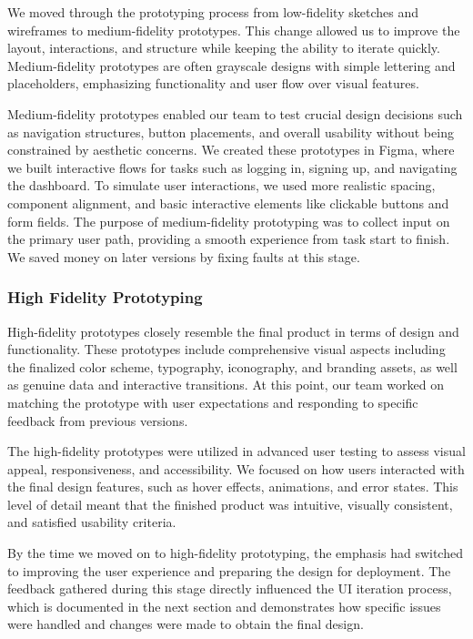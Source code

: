 We moved through the prototyping process from low-fidelity sketches and wireframes to medium-fidelity prototypes. This change allowed us to improve the layout, interactions, and structure while keeping the ability to iterate quickly. Medium-fidelity prototypes are often grayscale designs with simple lettering and placeholders, emphasizing functionality and user flow over visual features.

Medium-fidelity prototypes enabled our team to test crucial design decisions such as navigation structures, button placements, and overall usability without being constrained by aesthetic concerns. We created these prototypes in Figma, where we built interactive flows for tasks such as logging in, signing up, and navigating the dashboard. To simulate user interactions, we used more realistic spacing, component alignment, and basic interactive elements like clickable buttons and form fields.
The purpose of medium-fidelity prototyping was to collect input on the primary user path, providing a smooth experience from task start to finish. We saved money on later versions by fixing faults at this stage.


\subsubsection{High Fidelity Prototyping}
High-fidelity prototypes closely resemble the final product in terms of design and functionality. These prototypes include comprehensive visual aspects including the finalized color scheme, typography, iconography, and branding assets, as well as genuine data and interactive transitions. At this point, our team worked on matching the prototype with user expectations and responding to specific feedback from previous versions.

The high-fidelity prototypes were utilized in advanced user testing to assess visual appeal, responsiveness, and accessibility. We focused on how users interacted with the final design features, such as hover effects, animations, and error states. This level of detail meant that the finished product was intuitive, visually consistent, and satisfied usability criteria.

By the time we moved on to high-fidelity prototyping, the emphasis had switched to improving the user experience and preparing the design for deployment. The feedback gathered during this stage directly influenced the UI iteration process, which is documented in the next section and demonstrates how specific issues were handled and changes were made to obtain the final design.



